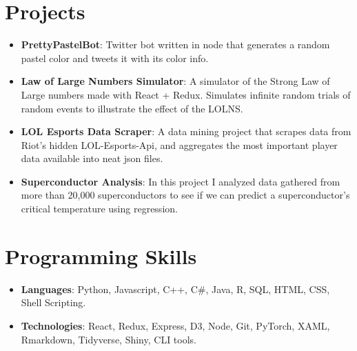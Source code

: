 \documentclass[letterpaper,11pt]{article}
\newcommand{\resumeItem}[2]{
  \item\small{
    \textbf{#1}{: #2 \vspace{-2pt}}
  }
}
\newcommand{\resumeSubItem}[2]{\resumeItem{#1}{#2}\vspace{-4pt}}
\newcommand{\resumeSubHeadingListStart}{\begin{itemize}[leftmargin=*]}
\newcommand{\resumeSubHeadingListEnd}{\end{itemize}}
\begin{document}
\section{Projects}
  \resumeSubHeadingListStart
    \resumeSubItem{PrettyPastelBot}
      {Twitter bot written in node that generates a random pastel color and tweets it with its color info.}
    \resumeSubItem{Law of Large Numbers Simulator}
      {A simulator of the Strong Law of Large numbers made with React + Redux. Simulates infinite random trials of random events to illustrate the effect of the LOLNS.}
    \resumeSubItem{LOL Esports Data Scraper}
      {A data mining project that scrapes data from Riot’s hidden LOL-Esports-Api, and aggregates the most important player data available into neat json files.}
    \resumeSubItem{Superconductor Analysis}
      {In this project I analyzed data gathered from more than 20,000 superconductors to see if we can predict a superconductor’s critical temperature using regression.}
  \resumeSubHeadingListEnd


\section{Programming Skills}
 \resumeSubHeadingListStart
   \resumeSubItem{Languages}
    {Python, Javascript, C++, C\#, Java, R, SQL, HTML, CSS, Shell Scripting.}
  \resumeSubItem{Technologies}
    {React, Redux, Express, D3, Node, Git, PyTorch, XAML, Rmarkdown, Tidyverse, Shiny, CLI tools.}
 \resumeSubHeadingListEnd


\end{document}
